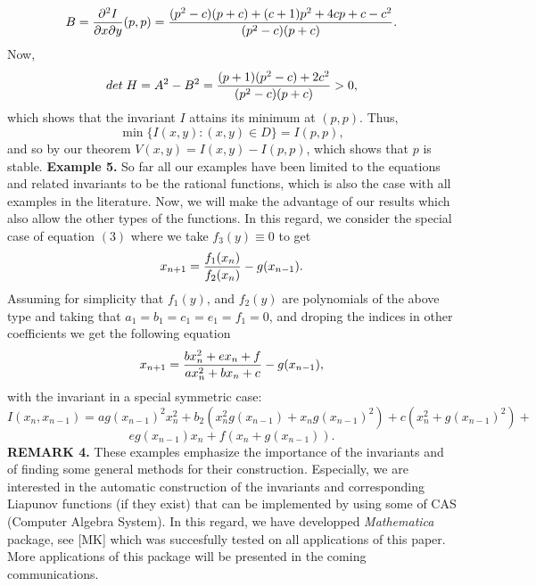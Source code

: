 $$B={\partial^2 I\over {\partial x \partial y}}(p,p)=
{{(p^2-c)(p+c)+(c+1)p^2+4cp+c-c^2}\over{(p^2-c)(p+c)}}.$$
Now,  
$$det\; H=A^2 - B^2 = {{(p+1)(p^2-c)+2c^2}\over {(p^2-c)(p+c)}}>0,$$ 
which shows that the invariant $I$ attains its minimum at $(p,p)$. Thus,   
$$\min \{I(x,y): (x,y)\in D\}=I(p,p),$$ 
and so by our theorem $V(x,y)=I(x,y)-I(p,p)$, which shows that $p$ is stable. 
\bigskip
{\bf Example 5.} 
\medskip
So far all our examples have been limited to the equations and related invariants 
to be the rational functions, which is also the case with all examples in the 
literature. Now, we will make the advantage of our results which also allow 
the other types of the functions. In this regard, we consider the special case of 
equation $(3)$ where we take $f_3(y)\equiv 0$ to get 
$$x_{n+1}={{f_1(x_n)}\over {f_2(x_n)}} - g(x_{n-1}). $$
Assuming for simplicity that $f_1(y)$, and $f_2(y)$ are polynomials of the above  
type and taking 
that $a_1=b_1=c_1=e_1=f_1=0$,  and droping the indices in other coefficients  we 
get the following equation 
$$x_{n+1}={{bx_n^2+ex_n+f}\over {ax_n^2+bx_n+c}} - g(x_{n-1}),$$
with the invariant in a special symmetric case:
$$I(x_n,x_{n-1})= ag(x_{n-1})^2 x_n^2 + b_2 (x_n^2 g(x_{n-1}) + x_n g(x_{n-1})^2) + 
c (x_n^2+g(x_{n-1})^2) +$$
$$e g(x_{n-1}) x_n  + f (x_n + g(x_{n-1})).$$
\bigskip
{\bf REMARK 4.} These examples emphasize the  importance of the 
invariants and of finding some general methods for their construction. 
Especially, we are interested in the automatic construction of the invariants and 
corresponding Liapunov functions (if they exist) that can be implemented by 
using some of CAS (Computer Algebra System). In this regard, we have developped 
{\it Mathematica} package, see [MK] which was succesfully tested on all applications 
of this paper. More applications of this package will be presented in the 
coming communications. 

\vfill\eject

